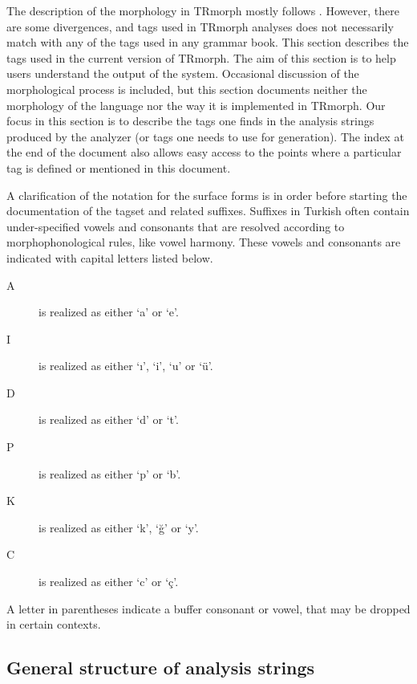 \documentclass[twocolumn]{article}
\begin{document}
The description of the morphology in TRmorph mostly follows
\cite{goksel2005}. However, there are some divergences, and tags used
in TRmorph analyses does not necessarily match with any of the tags
used in any grammar book. This section describes the tags used in the
current version of TRmorph.  The aim of this section is to help users
understand the output of the system. Occasional discussion of the
morphological process is included, but this section documents neither
the morphology of the language nor the way it is implemented in
TRmorph.  Our focus in this section is to describe the tags one finds
in the analysis strings produced by the analyzer (or tags one
needs to use for generation).  The index at the end of the document
also allows easy access to the points where a particular tag is
defined or mentioned in this document.

A clarification of the notation for the surface forms is in order
before starting the documentation of the tagset and related suffixes.
Suffixes in Turkish often contain under-specified vowels and
consonants that are resolved according to morphophonological rules,
like vowel harmony. These vowels and consonants are indicated with
capital letters listed below.

\begin{description}
\item[A] is realized as either `a' or  `e'.
\item[I] is realized as either `ı', `i', `u' or  `ü'.
\item[D] is realized as either `d' or  `t'.
\item[P] is realized as either `p' or  `b'.
\item[K] is realized as either `k', `ğ' or  `y'.
\item[C] is realized as either `c' or  `ç'.
\end{description}

A letter in parentheses indicate a buffer consonant or vowel, that may
be dropped in certain contexts.

\subsection{General structure of analysis strings}
\end{document}
